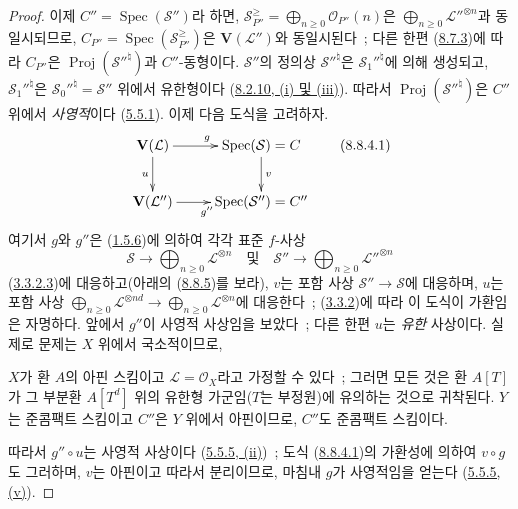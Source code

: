 \begin{proof}
이제 $C''=\operatorname{Spec}(\mathcal{S}'')$라 하면,
$\mathcal{S}_{P''}^{\geqslant}=
\bigoplus_{n\geqslant 0}\mathcal{O}_{P''}(n)$은
$\bigoplus_{n\geqslant 0}\mathcal{L}''^{\otimes n}$과 동일시되므로,
$C_{P''}=\operatorname{Spec}(\mathcal{S}_{P''}^{\geqslant})$은
$\mathbf{V}(\mathcal{L}'')$와 동일시된다~; 다른 한편
(\hyperref[II.8.7.3-ko]{8.7.3})에 따라 $C_{P''}$은
$\operatorname{Proj}(\mathcal{S}''^{\natural})$과 $C''$-동형이다.
$\mathcal{S}''$의 정의상 $\mathcal{S}''^{\natural}$은
$\mathcal{S}_1''^{\natural}$에 의해 생성되고,
$\mathcal{S}_1''^{\natural}$은
$\mathcal{S}_0''^{\natural}=\mathcal{S}''$ 위에서 유한형이다
(\hyperref[II.8.2.10-ko]{8.2.10, (i) 및 (iii)}). 따라서
$\operatorname{Proj}(\mathcal{S}''^{\natural})$은 $C''$ 위에서
\emph{사영적}이다 (\hyperref[II.5.5.1-ko]{5.5.1}). 이제 다음 도식을
고려하자.
\begin{equation}
\label{II.8.8.4.1-ko}
  \xymatrix{
    \mathbf{V}(\mathcal{L})\ar[r]^{g}\ar[d]_{u} &
    \operatorname{Spec}(\mathcal{S})=C\ar[d]^{v}\\
    \mathbf{V}(\mathcal{L}'')\ar[r]_{g''} &
    \operatorname{Spec}(\mathcal{S}'')=C''
  }
\tag{8.8.4.1}
\end{equation}
여기서 $g$와 $g''$은 (\hyperref[II.1.5.6-ko]{1.5.6})에 의하여 각각
표준 $f$-사상
\[
  \mathcal{S}\longrightarrow
  \bigoplus_{n\geqslant 0}\mathcal{L}^{\otimes n}
  \quad\text{및}\quad
  \mathcal{S}''\longrightarrow
  \bigoplus_{n\geqslant 0}\mathcal{L}''^{\otimes n}
\]
(\hyperref[II.3.3.2.3-ko]{3.3.2.3})에 대응하고(아래의
(\hyperref[II.8.8.5-ko]{8.8.5})를 보라), $v$는 포함 사상
$\mathcal{S}''\to\mathcal{S}$에 대응하며, $u$는 포함 사상
$\bigoplus_{n\geqslant 0}\mathcal{L}^{\otimes nd}\to
\bigoplus_{n\geqslant 0}\mathcal{L}^{\otimes n}$에 대응한다~;
(\hyperref[II.3.3.2-ko]{3.3.2})에 따라 이 도식이 가환임은 자명하다.
앞에서 $g''$이 사영적 사상임을 보았다~; 다른 한편 $u$는 \emph{유한}
사상이다. 실제로 문제는 $X$ 위에서 국소적이므로,

$X$가 환 $A$의 아핀 스킴이고 $\mathcal{L}=\mathcal{O}_X$라고 가정할 수
있다~; 그러면 모든 것은 환 $A[T]$가 그 부분환 $A[T^d]$ 위의
유한형 가군임($T$는 부정원)에 유의하는 것으로 귀착된다. $Y$는
준콤팩트 스킴이고 $C''$은 $Y$ 위에서 아핀이므로, $C''$도 준콤팩트
스킴이다.

따라서 $g''\circ u$는 사영적 사상이다
(\hyperref[II.5.5.5-ko]{5.5.5, (ii)})~; 도식
(\hyperref[II.8.8.4.1-ko]{8.8.4.1})의 가환성에 의하여 $v\circ g$도
그러하며, $v$는 아핀이고 따라서 분리이므로, 마침내 $g$가 사영적임을
얻는다 (\hyperref[II.5.5.5-ko]{5.5.5, (v)}).
\end{proof}

